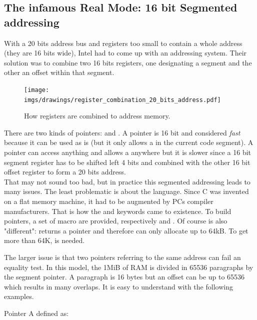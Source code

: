 \documentclass[book.tex]{subfiles}
\begin{document}
\subsection{The infamous Real Mode: 16 bit Segmented addressing}
With a 20 bits address bus and registers too small to contain a whole address (they are 16 bits wide), Intel had to come up with an addressing system. Their solution was to combine two 16 bits registers, one designating a segment and the other an offset within that segment.\\
\par
\begin{figure}[H]
\centering
\texttt{[image: imgs/drawings/register\_combination\_20\_bits\_address.pdf]}
\caption{How registers are combined to address memory.}
\label{fig:register_comb_to_20_bits}
\end{figure}
\par
There are two kinds of pointers:  and . A  pointer is 16 bit and considered \emph{fast} because it can be used as is (but it only allows a  in the current code segment). A  pointer can access anything and allows a  anywhere but it is slower since a 16 bit segment register has to be shifted left 4 bits and combined with the other 16 bit offset register to form a 20 bits address.\\

That may not sound too bad, but in practice this segmented addressing leads to many issues.
The least problematic is about the language. Since C was invented on a flat memory machine, it had to be augmented by PCs compiler manufacturers. That is how the  and  keywords came to existence. To build pointers, a set of macro are provided, respectively  and . Of course  is also "different":  returns a  pointer and therefore can only allocate up to 64kB. To get more than 64K,  is needed.\\
\par
The larger issue is that two pointers referring to the same address can fail an equality test. In this model, the 1MiB of RAM is divided in 65536 paragraphs by the segment pointer. A paragraph is 16 bytes but an offset can be up to 65536 which results in many overlaps. It is easy to understand with the following examples.\\
\par
Pointer A defined as:\\
\par
\begin{minipage}{\textwidth}

\end{minipage}
\end{document}
